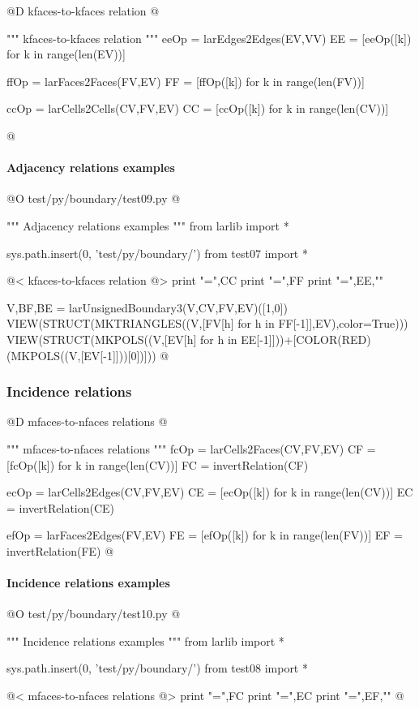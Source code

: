 \documentclass[11pt,oneside]{article}	%
\begin{document}
@D kfaces-to-kfaces relation
@{""" kfaces-to-kfaces relation """
eeOp = larEdges2Edges(EV,VV)
EE = [eeOp([k]) for k in range(len(EV))]

ffOp = larFaces2Faces(FV,EV)
FF = [ffOp([k]) for k in range(len(FV))]

ccOp = larCells2Cells(CV,FV,EV)
CC = [ccOp([k]) for k in range(len(CV))]

@}

\paragraph{Adjacency relations examples}
@O test/py/boundary/test09.py
@{""" Adjacency relations examples """
from larlib import *

sys.path.insert(0, 'test/py/boundary/')
from test07 import *

@< kfaces-to-kfaces relation @>
print "\nCC =",CC
print "\nFF =",FF
print "\nEE =",EE,"\n"

V,BF,BE = larUnsignedBoundary3(V,CV,FV,EV)([1,0])
VIEW(STRUCT(MKTRIANGLES((V,[FV[h] for h in FF[-1]],EV),color=True)))
VIEW(STRUCT(MKPOLS((V,[EV[h] for h in EE[-1]]))+[COLOR(RED)(MKPOLS((V,[EV[-1]]))[0])]))
@}


\subsubsection{Incidence relations}

@D mfaces-to-nfaces relations
@{""" mfaces-to-nfaces relations """
fcOp = larCells2Faces(CV,FV,EV)
CF = [fcOp([k]) for k in range(len(CV))]
FC = invertRelation(CF)

ecOp = larCells2Edges(CV,FV,EV)
CE = [ecOp([k]) for k in range(len(CV))]
EC = invertRelation(CE)
    
efOp = larFaces2Edges(FV,EV)
FE = [efOp([k]) for k in range(len(FV))]
EF = invertRelation(FE)
@}

\paragraph{Incidence relations examples}
@O test/py/boundary/test10.py
@{""" Incidence relations examples """
from larlib import *

sys.path.insert(0, 'test/py/boundary/')
from test08 import *

@< mfaces-to-nfaces relations @>
print "\nFC =",FC
print "\nEC =",EC
print "\nEF =",EF,"\n"
@}
\end{document}
